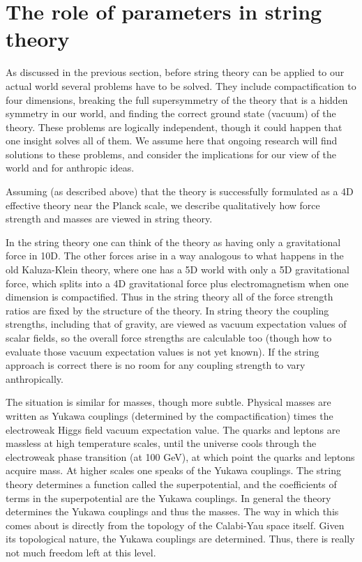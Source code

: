 \documentclass{article}
\begin{document}
\section{The role of parameters in string theory}

As discussed in the previous section, before string theory can be
applied to our actual world several problems have to be solved. They
include compactification to four dimensions, breaking the  full supersymmetry
of the theory that is a hidden symmetry in our world, and finding the
correct ground state (vacuum) of the theory. 
These problems are logically independent,
though it could happen that one insight solves all of them. We assume
here that ongoing research will find solutions to these problems, and
consider the implications for our view of the world and for anthropic
ideas.

Assuming (as described above) that the theory is successfully formulated
as a 4D effective theory near the Planck scale, we describe
qualitatively how force strength and masses are viewed in
string theory.

In the string theory one can think of the theory as having only a
gravitational force in 10D.  The other forces arise in a way analogous
to what happens in the old Kaluza-Klein theory, where one has a 5D world
with only a 5D gravitational force, which splits into a 4D gravitational
force plus electromagnetism when one dimension is compactified.  Thus in
the string theory all of the force strength ratios are fixed by the
structure of the theory.  In string theory the coupling strengths,
including that of gravity,  are
viewed as vacuum expectation values of scalar fields, so the overall
force strengths are calculable too (though how to evaluate those vacuum
expectation values is
not yet known).  If the string approach is correct there is no room for
any coupling strength to vary anthropically.

The situation is similar for masses, though more subtle.  Physical
masses are written as Yukawa couplings (determined by the
compactification) times the electroweak Higgs field vacuum expectation
value.  The quarks and leptons are massless at high temperature scales,
until the universe cools through the electroweak phase transition (at
100 GeV), at which point the quarks and leptons acquire mass.  At higher
scales one speaks of the Yukawa couplings.  The string theory determines
a function called the superpotential, and the coefficients of terms in
the superpotential are the Yukawa couplings.  In general the theory
determines the Yukawa couplings and thus the masses. The way in which
this comes about is directly from the topology of the Calabi-Yau space itself.
Given its topological nature, the Yukawa couplings are determined. 
Thus, there is really not much freedom left at this level.
\end{document}
